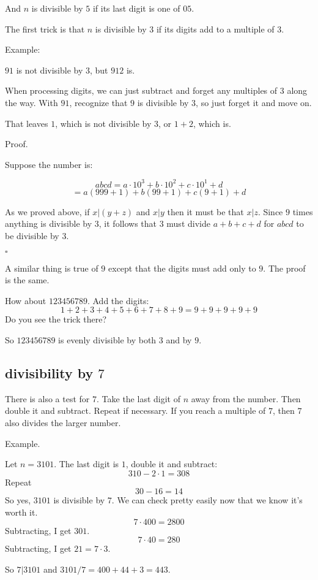 \documentclass[11pt, oneside]{article}
\begin{document}
And $n$ is divisible by $5$ if its last digit is one of $05$.

The first trick is that $n$ is divisible by $3$ if its digits add to a multiple of $3$.

Example:

$91$ is not divisible by $3$, but $912$ is.  

When processing digits, we can just subtract and forget any multiples of $3$ along the way.  With $91$, recognize that $9$ is divisible by $3$, so just forget it and move on.  

That leaves $1$, which is not divisible by $3$, or $1 + 2$, which is.

Proof.

Suppose the number is:

\[ abcd = a \cdot 10^3 + b \cdot 10^2 + c \cdot 10^1 + d \]
\[ = a (999 + 1) + b (99 + 1) + c (9 + 1) + d \]

As we proved above, if $x|(y+z)$ and $x|y$ then it must be that $x|z$.  Since $9$ times anything is divisible by $3$, it follows that $3$ must divide $a + b + c + d$ for $abcd$ to be divisible by $3$.

$\square$

A similar thing is true of $9$ except that the digits must add only to $9$.  The proof is the same.

How about $123456789$.  Add the digits:
\[ 1 + 2 + 3 + 4 + 5 + 6 + 7 + 8 + 9 = 9 + 9 + 9 + 9 + 9 \]
Do you see the trick there?

So $123456789$ is evenly divisible by both $3$ and by $9$.

\subsection*{divisibility by $7$}

There is also a test for $7$.  Take the last digit of $n$ away from the number.  Then double it and subtract.  Repeat if necessary.  If you reach a multiple of $7$, then $7$ also divides the larger number.

Example.

Let $n = 3101$.  The last digit is $1$, double it and subtract:
\[ 310 - 2 \cdot 1 = 308 \]
Repeat
\[ 30 - 16 = 14 \]
So yes, $3101$ is divisible by $7$.  We can check pretty easily now that we know it's worth it.
\[ 7 \cdot 400 = 2800 \]
Subtracting, I get $301$.
\[ 7 \cdot 40 = 280 \]
Subtracting, I get $21 = 7 \cdot 3$.  

So $7|3101$ and $3101/7 = 400 + 44 + 3 = 443$.
\end{document}
